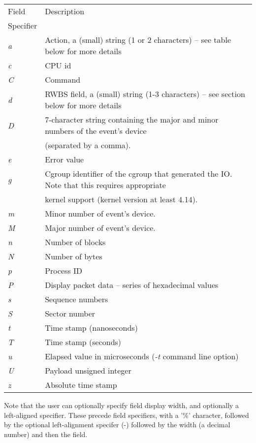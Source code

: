 \documentclass{article}
\begin{document}
\smallskip
\begin{tabular}{|l|l|}\hline
Field    & Description \\
Specifier & \\ \hline\hline
\emph{a} & Action, a (small) string (1 or 2 characters) -- see table below for more details \\ \hline
\emph{c} & CPU id \\ \hline
\emph{C} & Command \\ \hline
\emph{d} & RWBS field, a (small) string (1-3 characters)  -- see section below for more details \\ \hline
\emph{D} & 7-character string containing the major and minor numbers of
the event's device \\
         & (separated by a comma). \\ \hline
\emph{e} & Error value \\ \hline
\emph{g} & Cgroup identifier of the cgroup that generated the IO. Note that this requires
appropriate \\
         & kernel support (kernel version at least 4.14). \\ \hline
\emph{m} & Minor number of event's device. \\ \hline
\emph{M} & Major number of event's device. \\ \hline
\emph{n} & Number of blocks \\ \hline
\emph{N} & Number of bytes \\ \hline
\emph{p} & Process ID \\ \hline
\emph{P} & Display packet data -- series of hexadecimal values\\ \hline
\emph{s} & Sequence numbers \\ \hline
\emph{S} & Sector number \\ \hline
\emph{t} & Time stamp (nanoseconds) \\ \hline
\emph{T} & Time stamp (seconds) \\ \hline
\emph{u} & Elapsed value in microseconds (\emph{-t} command line option) \\ \hline
\emph{U} & Payload unsigned integer \\ \hline
\emph{z} & Absolute time stamp \\ \hline
\end{tabular}

Note that the user can optionally specify field display width, and
optionally a left-aligned specifier. These precede field specifiers,
with a '\%' character, followed by the optional left-alignment specifer
(-) followed by the width (a decimal number) and then the field.
\end{document}
